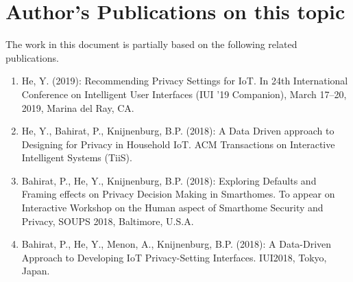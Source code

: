 \chapter{Author's Publications on this topic}
\noindent The work in this document is partially based on the following related publications.
\begin{enumerate}
	\item He, Y. (2019): Recommending Privacy Settings for IoT. In 24th International Conference on Intelligent User Interfaces (IUI ’19 Companion), March 17--20, 2019, Marina del Ray, CA.
	
	\item He, Y., Bahirat, P., Knijnenburg, B.P. (2018): A Data Driven approach to Designing for Privacy in Household IoT. ACM Transactions on Interactive Intelligent Systems (TiiS).
	
	\item Bahirat, P., He, Y., Knijnenburg, B.P. (2018): Exploring Defaults and Framing effects on Privacy Decision Making in Smarthomes.  To appear on Interactive Workshop on the Human aspect of Smarthome Security and Privacy, SOUPS 2018, Baltimore, U.S.A.
	\item Bahirat, P., He, Y., Menon, A., Knijnenburg, B.P. (2018): A Data-Driven Approach to Developing IoT Privacy-Setting Interfaces. IUI2018, Tokyo, Japan.
%	
\end{enumerate}